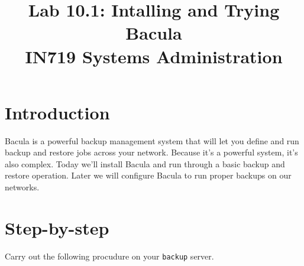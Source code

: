 \documentclass{article}   	%
\title{Lab 10.1:  Intalling and Trying Bacula\\ IN719 Systems Administration}
\date{}							%
\begin{document}
\maketitle

\section*{Introduction}
Bacula is a powerful backup management system that will let you define and run backup and restore jobs across your network.  Because it's a powerful system, it's also complex.  Today we'll install Bacula and run through a basic backup and restore operation.  Later we will configure Bacula to run proper backups on our networks.

\section*{Step-by-step}
Carry out the following procudure on your \texttt{backup} server.
\end{document}

